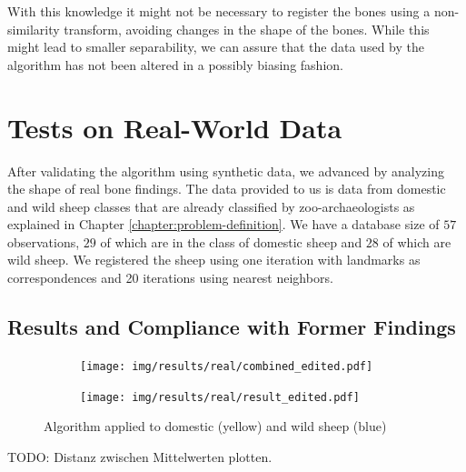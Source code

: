 \documentclass[pdftex,12pt,a4paper]{report}
\begin{document}
With this knowledge it might not be necessary to register the bones using a non-similarity transform, avoiding changes in the shape of the bones. While this might lead to smaller separability, we can assure that the data used by the algorithm has not been altered in a possibly biasing fashion.

\section{Tests on Real-World Data}

After validating the algorithm using synthetic data, we advanced by analyzing the shape of real bone findings. The data provided to us is data from domestic and wild sheep classes that are already classified by zoo-archaeologists as explained in Chapter \ref{chapter:problem-definition}. We have a database size of $57$ observations, $29$ of which are in the class of domestic sheep and $28$ of which are wild sheep. We registered the sheep using one iteration with landmarks as correspondences and 20 iterations using nearest neighbors.

\subsection{Results and Compliance with Former Findings} 

\begin{figure}
	\centering
	\begin{subfigure}[b]{0.32\textwidth}
		\centering
		\texttt{[image: img/results/real/combined\_edited.pdf]}
		\label{fig:main-result-data}
	\end{subfigure}
	\begin{subfigure}[b]{0.64\textwidth}
		\centering
		\texttt{[image: img/results/real/result\_edited.pdf]}
		\label{fig:main-result-chart}
	\end{subfigure}
	\caption{Algorithm applied to domestic (yellow) and wild sheep (blue)}
	\label{fig:main-result}
\end{figure}

TODO: Distanz zwischen Mittelwerten plotten.
\end{document}
